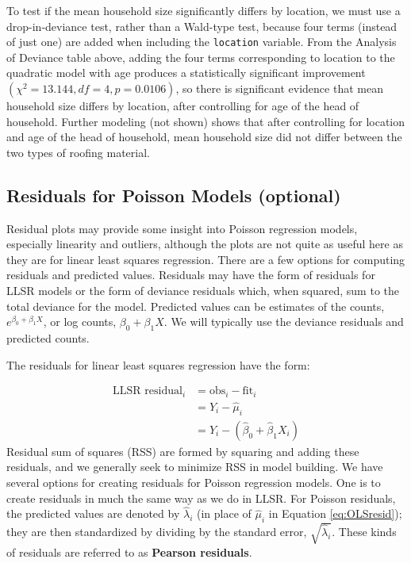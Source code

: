 \documentclass[
]{krantz}
\begin{document}
To test if the mean household size significantly differs by location, we must use a drop-in-deviance test, rather than a Wald-type test, because four terms (instead of just one) are added when including the \texttt{location} variable. From the Analysis of Deviance table above, adding the four terms corresponding to location to the quadratic model with age produces a statistically significant improvement \((\chi^2=13.144, df = 4, p=0.0106)\), so there is significant evidence that mean household size differs by location, after controlling for age of the head of household. Further modeling (not shown) shows that after controlling for location and age of the head of household, mean household size did not differ between the two types of roofing material.

\hypertarget{sec-PoisResid}{%
\subsection{Residuals for Poisson Models (optional)}\label{sec-PoisResid}}

Residual plots may provide some insight into Poisson regression models, especially linearity and outliers, although the plots are not quite as useful here as they are for linear least squares regression. There are a few options for computing residuals and predicted values. Residuals may have the form of residuals for LLSR models or the form of deviance residuals which, when squared, sum to the total deviance for the model. Predicted values can be estimates of the counts, \(e^{\beta_0+\beta_1X}\), or log counts, \(\beta_0+\beta_1X\). We will typically use the deviance residuals and predicted counts.

The residuals for linear least squares regression have the form:

\begin{align}
 \textrm{LLSR residual}_i  &= \textrm{obs}_i - \textrm{fit}_i \nonumber \\
&={Y_i-\hat{\mu}_i} \nonumber \\
 &= Y_i-(\hat{\beta}_0 +\hat{\beta}_1 X_i)
\label{eq:OLSresid}
 \end{align}
Residual sum of squares (RSS) are formed by squaring and adding these residuals, and we generally seek to minimize RSS in model building. We have several options for creating residuals for Poisson regression models. One is to create residuals in much the same way as we do in LLSR. For Poisson residuals, the predicted values are denoted by \(\hat{\lambda}_i\) (in place of \(\hat{\mu}_i\) in Equation \eqref{eq:OLSresid}); they are then standardized by dividing by the standard error, \(\sqrt{\hat{\lambda}_i}\). These kinds of residuals are referred to as \textbf{Pearson residuals}. 
\end{document}
